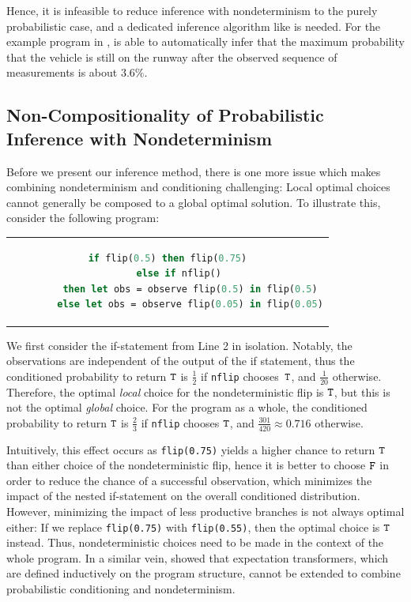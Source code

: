 Hence, it is infeasible to reduce inference with nondeterminism to the purely probabilistic case, and a dedicated inference algorithm like \NDICE is needed.
For the example program in , \NDICE is able to automatically infer that the maximum probability that the vehicle is still on the runway after the observed sequence of measurements is about $3.6 \%$.



\subsection{Non-Compositionality of Probabilistic Inference with Nondeterminism}\label{sec:subOpt}
Before we present our inference method, there is one more issue which makes combining nondeterminism and conditioning challenging:
Local optimal choices cannot generally be composed to a global optimal solution.
To illustrate this, consider the following \NDICE program:%
%
\smallskip%
\begin{center}
	\begin{tabular}{c}
\begin{lstlisting}[language=Caml]
if flip(0.5) then flip(0.75)
	else if nflip()
		then let obs = observe flip(0.5) in flip(0.5)
		else let obs = observe flip(0.05) in flip(0.05)
\end{lstlisting}
\end{tabular}
\end{center}%
\smallskip%
%
We first consider the if-statement from Line 2 in isolation.
Notably, the observations are independent of the output of the if statement, thus the conditioned probability to return $\texttt{T}$ is $\frac{1}{2}$ if \texttt{nflip} chooses~$\texttt{T}$, and $\frac{1}{20}$ otherwise.
Therefore, the optimal \textit{local} choice for the nondeterministic flip is $\texttt{T}$, but this is not the optimal \textit{global} choice.
For the program as a whole, the conditioned probability to return $\texttt{T}$  is $\frac{2}{3}$ if \texttt{nflip} chooses $\texttt{T}$, and $\frac{301}{420}\approx 0.716$ otherwise.

Intuitively, this effect occurs as \verb|flip(0.75)| yields a higher chance to return $\texttt{T}$ than either choice of the nondeterministic flip, hence it is better to choose $\texttt{F}$ in order to reduce the chance of a successful observation, which minimizes the impact of the nested if-statement on the overall conditioned distribution.
However, minimizing the impact of less productive branches is not always optimal either:
If we replace \verb|flip(0.75)| with \verb|flip(0.55)|, then the optimal choice is $\texttt{T}$ instead.
Thus, nondeterministic choices need to be made in the context of the whole program.
In a similar vein, \citet{olmedo2018conditioning} showed that expectation transformers, which are defined inductively on the program structure, cannot be extended to combine probabilistic conditioning and nondeterminism.


